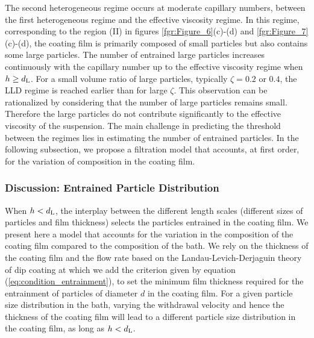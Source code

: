 \documentclass{jfm}
\begin{document}
The second heterogeneous regime occurs at moderate capillary numbers, between the first heterogeneous regime and the effective viscosity regime. In this regime, corresponding to the region (II) in figures \ref{fgr:Figure_6}(c)-(d) and \ref{fgr:Figure_7}(c)-(d), the coating film is primarily composed of small particles but also contains some large particles. The number of entrained large particles increases continuously with the capillary number up to the effective viscosity regime when $h \geq d_{\rm L}$. For a small volume ratio of large particles, typically $\zeta=0.2$ or $0.4$, the LLD regime is reached earlier than for large $\zeta$. This observation can be rationalized by considering that the number of large particles remains small. Therefore the large particles do not contribute significantly to the effective viscosity of the suspension. The main challenge in predicting the threshold between the regimes lies in estimating the number of entrained particles. In the following subsection, we propose a filtration model that accounts, at first order, for the variation of composition in the coating film.
 

 \subsubsection{Discussion: Entrained Particle Distribution}

When $h<d_{\rm L}$, the interplay between the different length scales (different sizes of particles and film thickness) selects the particles entrained in the coating film. We present here a model that accounts for the variation in the composition of the coating film compared to the composition of the bath. We rely on the thickness of the coating film and the flow rate based on the Landau-Levich-Derjaguin theory of dip coating \cite[][]{levich1942dragging} at which we add the criterion given by equation (\ref{eq:condition_entrainment}), to set the minimum film thickness required for the entrainment of particles of diameter $d$ in the coating film. For a given particle size distribution in the bath, 
varying the withdrawal velocity and hence the thickness of the coating film will lead to a different particle size distribution in the coating film, as long as $h<d_{\rm L}$.
\end{document}
